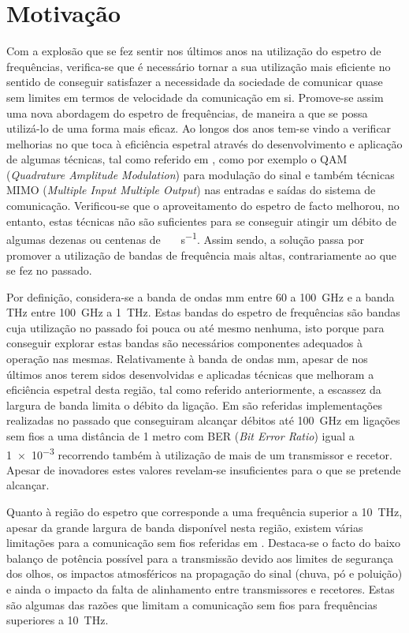 \section{Motivação} \label{sec:goals}
Com a explosão que se fez sentir nos últimos anos na utilização do espetro de frequências, verifica-se que é necessário tornar a sua utilização mais eficiente no sentido de conseguir satisfazer a necessidade da sociedade de comunicar quase sem limites em termos de velocidade da comunicação em si. Promove-se assim uma nova abordagem do espetro de frequências, de maneira a que se possa utilizá-lo de uma forma mais eficaz.  
Ao longos dos anos tem-se vindo a verificar melhorias no que toca à eficiência espetral através do desenvolvimento e aplicação de algumas técnicas, tal como referido em \cite{R007}, como por exemplo o QAM (\textit{Quadrature Amplitude Modulation}) para modulação do sinal e também técnicas MIMO (\textit{Multiple Input Multiple Output}) nas entradas e saídas do sistema de comunicação. Verificou-se que o aproveitamento do espetro de facto melhorou, no entanto, estas técnicas não são suficientes para se conseguir atingir um débito de algumas dezenas ou centenas de \SI{}{\giga\bit\per\second}. Assim sendo, a solução passa por promover a utilização de bandas de frequência mais altas, contrariamente ao que se fez no passado.  

Por definição, considera-se a banda de ondas mm entre 60 a \SI{100}{\giga\hertz} e a banda THz entre \SI{100}{\giga\hertz} a \SI{1}{\tera\hertz}. Estas bandas do espetro de frequências são bandas cuja utilização no passado foi pouca ou até mesmo nenhuma, isto porque para conseguir explorar estas bandas são necessários componentes adequados à operação nas mesmas. Relativamente à banda de ondas mm, apesar de nos últimos anos terem sidos desenvolvidas e aplicadas técnicas que melhoram a eficiência espetral desta região, tal como referido anteriormente, a escassez da largura de banda limita o débito da ligação. Em \cite{R007} são referidas implementações realizadas no passado que conseguiram alcançar débitos até  \SI{100}{\giga\hertz} em ligações sem fios a uma distância de 1 metro com BER (\textit{Bit Error Ratio}) igual a \num{1e-3} recorrendo também à utilização de mais de um transmissor e recetor. Apesar de inovadores estes valores revelam-se insuficientes para o que se pretende alcançar. 

Quanto à região do espetro que corresponde a uma frequência superior a \SI{10}{\tera\hertz}, apesar da grande largura de banda disponível nesta região, existem várias limitações para a comunicação sem fios referidas em \cite{R005}. Destaca-se o facto do baixo balanço de potência possível para a transmissão devido aos limites de segurança dos olhos, os impactos atmosféricos na propagação do sinal (chuva, pó e poluição) e ainda o impacto da falta de alinhamento entre transmissores e recetores. Estas são algumas das razões que limitam a comunicação sem fios para frequências superiores a \SI{10}{\tera\hertz}.


